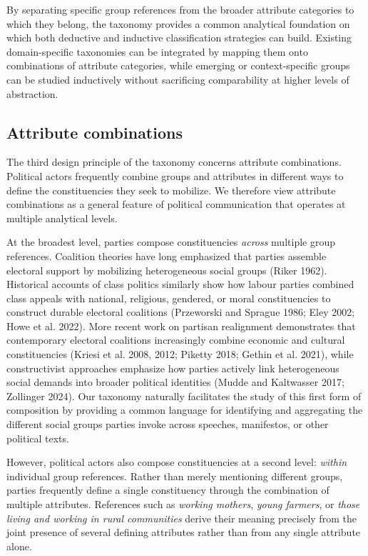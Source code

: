 \documentclass[12pt]{article}
\begin{document}
By separating specific group references from the broader attribute categories to which they belong, the taxonomy provides a common analytical foundation on which both deductive and inductive classification strategies can build.
Existing domain-specific taxonomies can be integrated by mapping them onto combinations of attribute categories, while emerging or context-specific groups can be studied inductively without sacrificing comparability at higher levels of abstraction.

\subsection{Attribute combinations}\label{attribute-combinations}

The third design principle of the taxonomy concerns attribute combinations.
Political actors frequently combine groups and attributes in different ways to define the constituencies they seek to mobilize.
We therefore view attribute combinations as a general feature of political communication that operates at multiple analytical levels.

At the broadest level, parties compose constituencies \emph{across} multiple group references.
Coalition theories have long emphasized that parties assemble electoral support by mobilizing heterogeneous social groups (Riker 1962).
Historical accounts of class politics similarly show how labour parties combined class appeals with national, religious, gendered, or moral constituencies to construct durable electoral coalitions (Przeworski and Sprague 1986; Eley 2002; Howe et al. 2022).
More recent work on partisan realignment demonstrates that contemporary electoral coalitions increasingly combine economic and cultural constituencies (Kriesi et al. 2008, 2012; Piketty 2018; Gethin et al. 2021), while constructivist approaches emphasize how parties actively link heterogeneous social demands into broader political identities (Mudde and Kaltwasser 2017; Zollinger 2024).
Our taxonomy naturally facilitates the study of this first form of composition by providing a common language for identifying and aggregating the different social groups parties invoke across speeches, manifestos, or other political texts.

However, political actors also compose constituencies at a second level: \emph{within} individual group references.
Rather than merely mentioning different groups, parties frequently define a single constituency through the combination of multiple attributes.
References such as \emph{working mothers}, \emph{young farmers}, or \emph{those living and working in rural communities} derive their meaning precisely from the joint presence of several defining attributes rather than from any single attribute alone.
\end{document}
